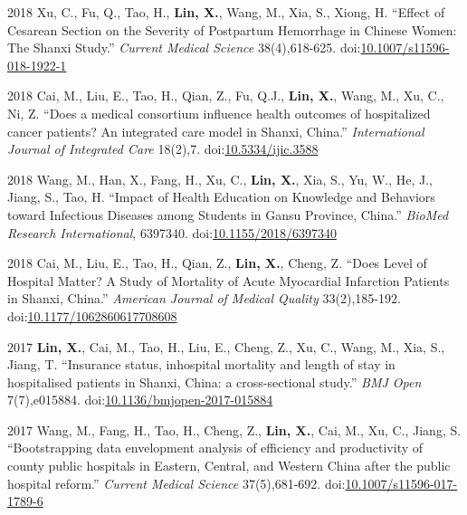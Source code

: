 \documentclass[12pt,letterpaper]{report}
\begin{document}
\begin{tablist}
    	\item[2018] \tab Xu, C., Fu, Q., Tao, H., \textbf{Lin, X.}, Wang, M., Xia, S., Xiong, H. \enquote{Effect of Cesarean Section on the Severity of Postpartum Hemorrhage in Chinese Women: The Shanxi Study.} \textit{Current Medical Science} 38(4),618-625. doi:\href{https://doi.org/10.1007/s11596-018-1922-1}{10.1007/s11596-018-1922-1}
    	
    	 \item[2018] \tab Cai, M., Liu, E., Tao, H., Qian, Z., Fu, Q.J., \textbf{Lin, X.}, Wang, M., Xu, C., Ni, Z. \enquote{Does a medical consortium influence health outcomes of hospitalized cancer patients? An integrated care model in Shanxi, China.} \textit{International Journal of Integrated Care}  18(2),7. doi:\href{https://doi.org/10.5334/ijic.3588}{10.5334/ijic.3588}
    	 
		\item[2018] \tab Wang, M., Han, X., Fang, H., Xu, C., \textbf{Lin, X.}, Xia, S., Yu, W., He, J., Jiang, S., Tao, H. \enquote{Impact of Health Education on Knowledge and Behaviors toward Infectious Diseases among Students in Gansu Province, China.} \textit{BioMed Research International}, 6397340. doi:\href{https://doi.org/10.1155/2018/6397340}{10.1155/2018/6397340}
		
		\item[2018] \tab Cai, M., Liu, E., Tao, H., Qian, Z., \textbf{Lin, X.}, Cheng, Z. \enquote{Does Level of Hospital Matter? A Study of Mortality of Acute Myocardial Infarction Patients in Shanxi, China.} \textit{American Journal of Medical Quality}  33(2),185-192. doi:\href{https://doi.org/10.1177/1062860617708608}{10.1177/1062860617708608}
		
		\item[2017] \tab  \textbf{Lin, X.}, Cai, M., Tao, H., Liu, E., Cheng, Z., Xu, C., Wang, M., Xia, S., Jiang, T. \enquote{Insurance status, inhospital mortality and length of stay in hospitalised patients in Shanxi, China: a cross-sectional study.} \textit{BMJ Open}  7(7),e015884. doi:\href{https://doi.org/10.1136/bmjopen-2017-015884}{10.1136/bmjopen-2017-015884}
		   
		\item[2017] \tab Wang, M., Fang, H., Tao, H., Cheng, Z., \textbf{Lin, X.}, Cai, M., Xu, C., Jiang, S. \enquote{Bootstrapping data envelopment analysis of efficiency and productivity of county public hospitals in Eastern, Central, and Western China after the public hospital reform.} \textit{Current Medical Science}  37(5),681-692. doi:\href{https://doi.org/10.1007/s11596-017-1789-6}{10.1007/s11596-017-1789-6}
    	 

\end{tablist}
\end{document}
